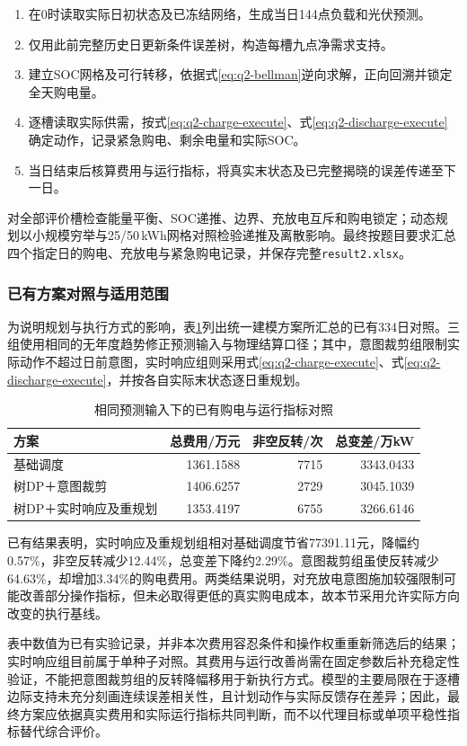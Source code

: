 \begin{enumerate}[label=\arabic*）,leftmargin=2.6em,itemsep=2pt]
\item 在0时读取实际日初状态及已冻结网络，生成当日144点负载和光伏预测。
\item 仅用此前完整历史日更新条件误差树，构造每槽九点净需求支持。
\item 建立SOC网格及可行转移，依据式\eqref{eq:q2-bellman}逆向求解，正向回溯并锁定全天购电量。
\item 逐槽读取实际供需，按式\eqref{eq:q2-charge-execute}、式\eqref{eq:q2-discharge-execute}确定动作，记录紧急购电、剩余电量和实际SOC。
\item 当日结束后核算费用与运行指标，将真实末状态及已完整揭晓的误差传递至下一日。
\end{enumerate}

对全部评价槽检查能量平衡、SOC递推、边界、充放电互斥和购电锁定；动态规划以小规模穷举与25/50\,kWh网格对照检验递推及离散影响。最终按题目要求汇总四个指定日的购电、充放电与紧急购电记录，并保存完整\texttt{result2.xlsx}。

\subsubsection{已有方案对照与适用范围}

为说明规划与执行方式的影响，表\ref{tab:q2-existing-results}列出统一建模方案所汇总的已有334日对照。三组使用相同的无年度趋势修正预测输入与物理结算口径；其中，意图裁剪组限制实际动作不超过日前意图，实时响应组则采用式\eqref{eq:q2-charge-execute}、式\eqref{eq:q2-discharge-execute}，并按各自实际末状态逐日重规划。

\begin{table}[htbp]
\centering\small
\caption{相同预测输入下的已有购电与运行指标对照}\label{tab:q2-existing-results}
\setlength{\tabcolsep}{4pt}
\renewcommand{\arraystretch}{1.18}
\begin{tabularx}{\textwidth}{Xrrr}
\toprule
方案 & 总费用/万元 & 非空反转/次 & 总变差/万kW\\
\midrule
基础调度 & 1361.1588 & 7715 & 3343.0433\\
树DP＋意图裁剪 & 1406.6257 & 2729 & 3045.1039\\
树DP＋实时响应及重规划 & 1353.4197 & 6755 & 3266.6146\\
\bottomrule
\end{tabularx}
\end{table}

已有结果表明，实时响应及重规划组相对基础调度节省77391.11元，降幅约0.57\%，非空反转减少12.44\%，总变差下降约2.29\%。意图裁剪组虽使反转减少64.63\%，却增加3.34\%的购电费用。两类结果说明，对充放电意图施加较强限制可能改善部分操作指标，但未必取得更低的真实购电成本，故本节采用允许实际方向改变的执行基线。

表中数值为已有实验记录，并非本次费用容忍条件和操作权重重新筛选后的结果；实时响应组目前属于单种子对照。其费用与运行改善尚需在固定参数后补充稳定性验证，不能把意图裁剪组的反转降幅移用于新执行方式。模型的主要局限在于逐槽边际支持未充分刻画连续误差相关性，且计划动作与实际反馈存在差异；因此，最终方案应依据真实费用和实际运行指标共同判断，而不以代理目标或单项平稳性指标替代综合评价。

\clearpage
